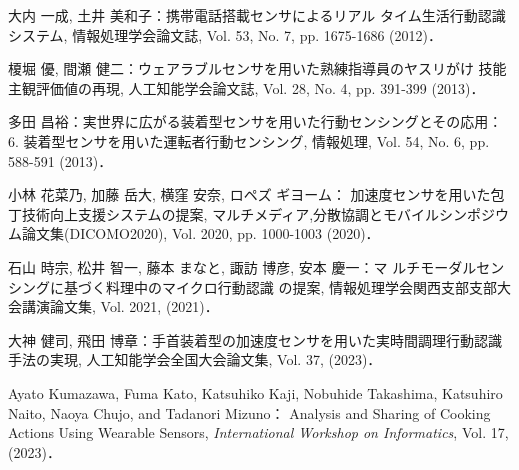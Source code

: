\thispagestyle{myheadings}
    
\begin{thebibliography}{参考文献}

	大内 一成, 土井 美和子：携帯電話搭載センサによるリアル
	タイム生活行動認識システム, 情報処理学会論文誌, Vol. 53,
	No. 7, pp. 1675-1686 (2012)．
	
	榎堀 優, 間瀬 健二：ウェアラブルセンサを用いた熟練指導員のヤスリがけ
	技能主観評価値の再現, 人工知能学会論文誌, Vol. 28, No. 4, pp. 391-399 (2013)．
	
	多田 昌裕：実世界に広がる装着型センサを用いた行動センシングとその応用：6. 装着型センサを用いた運転者行動センシング, 情報処理, Vol. 54, No. 6, pp. 588-591 (2013)．
	
	小林 花菜乃, 加藤 岳大, 横窪 安奈, ロペズ ギヨーム：
	加速度センサを用いた包丁技術向上支援システムの提案, マルチメディア,分散協調とモバイルシンポジウム論文集(DICOMO2020), Vol. 2020, pp. 1000-1003 (2020)．
	
	石山 時宗, 松井 智一, 藤本 まなと, 諏訪 博彦, 安本 慶一：マ
	ルチモーダルセンシングに基づく料理中のマイクロ行動認識
	の提案, 情報処理学会関西支部支部大会講演論文集, Vol. 2021, (2021)．
	
	大神 健司, 飛田 博章：手首装着型の加速度センサを用いた実時間調理行動認識手法の実現,
	 人工知能学会全国大会論文集, Vol. 37, (2023)．
	
	Ayato Kumazawa, Fuma Kato, Katsuhiko Kaji, Nobuhide Takashima, Katsuhiro Naito, Naoya Chujo, and Tadanori Mizuno：
	Analysis and Sharing of Cooking Actions Using Wearable Sensors, 
	\textit{International Workshop on Informatics}, Vol. 17, (2023)．
\end{thebibliography}
